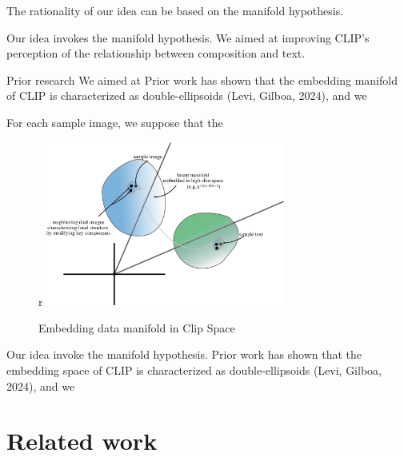 \documentclass[11pt,letterpaper]{article}
\begin{document}
The rationality of our idea can be based on the manifold hypothesis. 

Our idea invokes the manifold hypothesis. 
We aimed at improving CLIP's perception of the relationship between composition and text. 




Prior research 
We aimed at 
Prior work has shown that the embedding manifold of CLIP is characterized as double-ellipsoids\cite{levi2024doubleellipsoidgeometryclip} (Levi, Gilboa, 2024), and we 

For each sample image, we suppose that the 
\begin{figure}{r}{\textwidth} %
    \centering
    \includegraphics[width=0.7\textwidth]{midterm_report/assets/manifold.png}
    \caption{Embedding data manifold in Clip Space}
\end{figure}
Our idea invoke the manifold hypothesis. Prior work has shown that the embedding space of CLIP is characterized as double-ellipsoids\cite{levi2024doubleellipsoidgeometryclip} (Levi, Gilboa, 2024), and we 

\section{Related work}
\end{document}
